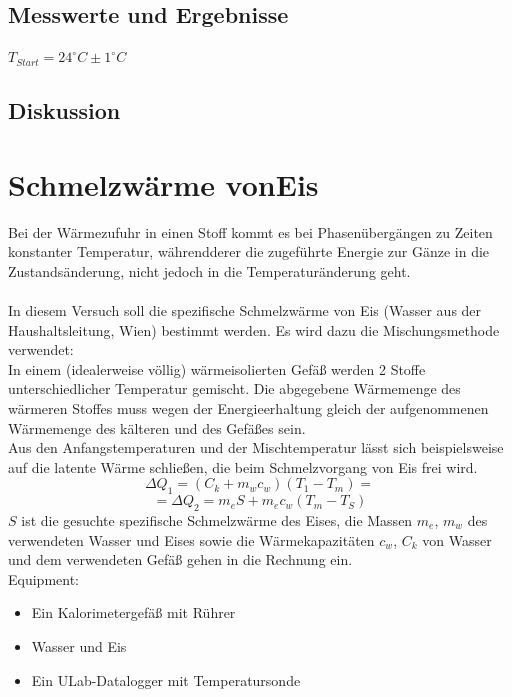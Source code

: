 \documentclass[12pt,a4paper]{article}
\begin{document}
\begin{multicols}{2}
\subsection{Messwerte und Ergebnisse}
$T_{Start} = 24^{\circ}C \pm 1^{\circ}C$\\


\subsection{Diskussion}



\section{Schmelzwärme vonEis}
Bei der Wärmezufuhr in einen Stoff kommt es bei Phasenübergängen zu Zeiten konstanter Temperatur, währendderer die zugeführte Energie zur Gänze in die Zustandsänderung, nicht jedoch in die Temperaturänderung geht.\\
\\
In diesem Versuch soll die spezifische Schmelzwärme von Eis (Wasser aus der Haushaltsleitung, Wien) bestimmt werden. Es wird dazu die Mischungsmethode verwendet:\\
In einem (idealerweise völlig) wärmeisolierten Gefäß werden 2 Stoffe unterschiedlicher Temperatur gemischt. Die abgegebene Wärmemenge des wärmeren Stoffes muss wegen der Energieerhaltung gleich der aufgenommenen Wärmemenge des kälteren und des Gefäßes sein.\\
Aus den Anfangstemperaturen und der Mischtemperatur lässt sich beispielsweise auf die latente Wärme schließen, die beim Schmelzvorgang von Eis frei wird.
$$\Delta Q_1=(C_k+m_wc_w)(T_1-T_m)=$$
$$=\Delta Q_2 = m_eS+m_ec_w(T_m-T_S)$$
$S$ ist die gesuchte spezifische Schmelzwärme des Eises, die Massen $m_e$, $m_w$ des verwendeten Wasser und Eises sowie die Wärmekapazitäten $c_w$, $C_k$ von Wasser und dem verwendeten Gefäß gehen in die Rechnung ein.\\

\noindent Equipment:
\begin {itemize}
	\item Ein Kalorimetergefäß mit Rührer
	\item Wasser und Eis
	\item Ein ULab-Datalogger mit Temperatursonde
\end {itemize}


\end{multicols}
\end{document}
